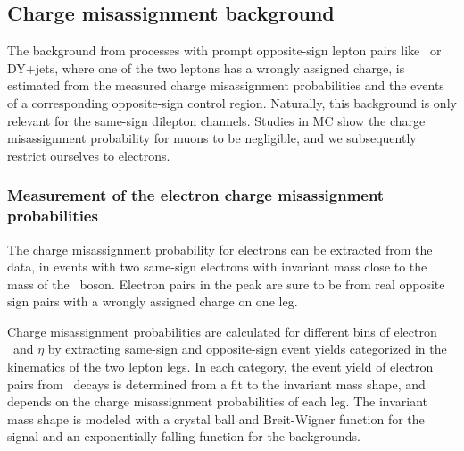 \subsection{Charge misassignment background}
The background from processes with prompt opposite-sign lepton pairs like \ttbar\ or DY+jets, where one of the two leptons has a wrongly assigned charge, is estimated from the measured charge misassignment probabilities and the events of a corresponding opposite-sign control region.
Naturally, this background is only relevant for the same-sign dilepton channels.
Studies in MC show the charge misassignment probability for muons to be negligible, and we subsequently restrict ourselves to electrons.

\subsubsection{Measurement of the electron charge misassignment probabilities}
The charge misassignment probability for electrons can be extracted from the data, in events with two same-sign electrons with invariant mass close to the mass of the \Z\ boson.
Electron pairs in the peak are sure to be from real opposite sign pairs with a wrongly assigned charge on one leg.


Charge misassignment probabilities are calculated for different bins of electron \pt\ and $\eta$ by extracting same-sign and opposite-sign event yields categorized in the kinematics of the two lepton legs.
In each category, the event yield of electron pairs from \Z\ decays is determined from a fit to the invariant mass shape, and depends on the charge misassignment probabilities of each leg.
The invariant mass shape is modeled with a crystal ball and Breit-Wigner function for the signal and an exponentially falling function for the backgrounds.

